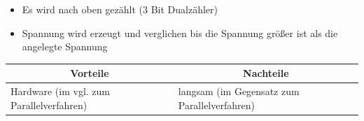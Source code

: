 \begin{itemize}
	\item Es wird nach oben gezählt (3 Bit Dualzähler)
	\item Spannung wird erzeugt und verglichen bis die Spannung größer ist als die angelegte Spannung
\end{itemize}

\begin{table}[H]
	\begin{tabular}{l|l}
		\multicolumn{1}{c}{Vorteile} & \multicolumn{1}{c}{Nachteile} \\
		\hline
		Hardware (im vgl. zum Parallelverfahren) & langsam (im Gegensatz zum Parallelverfahren) \\
	\end{tabular}
\end{table}



